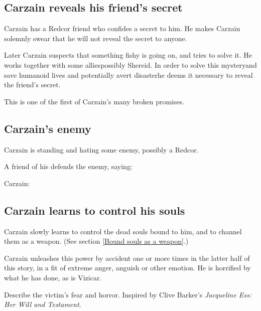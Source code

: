 \subsection{Carzain reveals his friend's secret}
Carzain has a Redcor friend who confides a secret to him. He makes Carzain solemnly swear that he will not reveal the secret to anyone. 

Later Carzain suspects that something fishy is going on, and tries to solve it. He works together with some allies\dash possibly Shereid. 
In order to solve this mystery\dash and save humanoid lives and potentially avert disaster\dash he deems it necessary to reveal the friend's secret. 

This is one of the first of Carzain's many broken promises.







\subsection{Carzain's \human{} enemy}
Carzain is standing and hating some enemy, possibly a Redcor. 

A friend of his defends the enemy, saying: 

Carzain: 







\subsection{Carzain learns to control his souls}
Carzain slowly learns to control the dead souls bound to him, and to channel them as a weapon. (See section \ref{Bound souls as a weapon}.)

Carzain unleashes this power by accident one or more times in the latter half of this story, in a fit of extreme anger, anguish or other emotion. He is horrified by what he has done, as is Vizicar. 

Describe the victim's fear and horror. Inspired by Clive Barker's \emph{Jacqueline Ess: Her Will and Testament}. 

